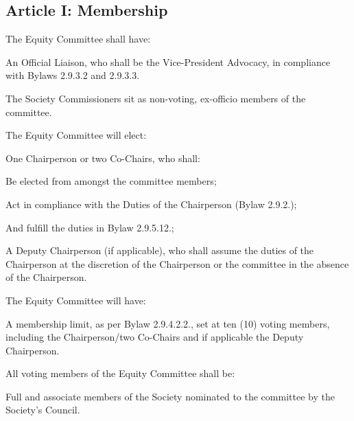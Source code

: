 \subsection{Article I: Membership}
\begin{longenum}[ label*=\thesubsection.\arabic*., align=left] 
\item The Equity Committee shall have:
	\begin{longenum}[ label*=\arabic*., align=left] 
	\item An Official Liaison, who shall be the Vice-President Advocacy, in compliance with Bylaws 2.9.3.2 and 2.9.3.3.
	\item The Society Commissioners sit as non-voting, ex-officio members of the committee.
	\end{longenum}
\item The Equity Committee will elect:
	\begin{longenum}[ label*=\arabic*., align=left] 
	\item One Chairperson or two Co-Chairs, who shall:
		\begin{longenum}[ label*=\arabic*., align=left] 
		\item Be elected from amongst the committee members;
		\item Act in compliance with the Duties of the Chairperson (Bylaw 2.9.2.);
		\item And fulfill the duties in Bylaw 2.9.5.12.;
		\end{longenum}
	\item A Deputy Chairperson (if applicable), who shall assume the duties of the Chairperson at the discretion of the Chairperson or the committee in the absence of the Chairperson.
	\end{longenum}
\item The Equity Committee will have:
	\begin{longenum}[ label*=\arabic*., align=left] 
	\item A membership limit, as per Bylaw 2.9.4.2.2., set at ten (10) voting members, including the Chairperson/two Co-Chairs and if applicable the Deputy Chairperson.
	\end{longenum}
\item All voting members of the Equity Committee shall be:
	\begin{longenum}[ label*=\arabic*., align=left] 
	\item Full and associate members of the Society nominated to the committee by the Society's Council.
	\end{longenum}
\end{longenum}

